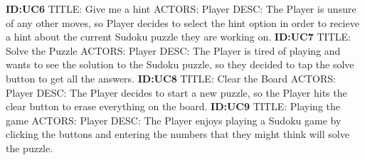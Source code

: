 \documentclass{article}
\begin{document}
\textbf{ID:UC6} \newline TITLE: Give me a hint \newline ACTORS: Player \newline DESC: The Player is unsure of any other moves, so Player decides to select the hint option in order to recieve a hint about the current Sudoku puzzle they are working on. \newline \newline
\textbf{ID:UC7} \newline TITLE: Solve the Puzzle \newline ACTORS: Player \newline DESC: The Player is tired of playing and wants to see the solution to the Sudoku puzzle, so they decided to tap the solve button to get all the answers. \newline \newline
\textbf{ID:UC8} \newline TITLE: Clear the Board \newline ACTORS: Player \newline DESC: The Player decides to start a new puzzle, so the Player hits the clear button to erase everything on the board. \newline \newline
\textbf{ID:UC9} \newline TITLE: Playing the game \newline ACTORS: Player \newline DESC: The Player enjoys playing a Sudoku game by clicking the buttons and entering the numbers that they might think will solve the puzzle. \newline
\end{document}
